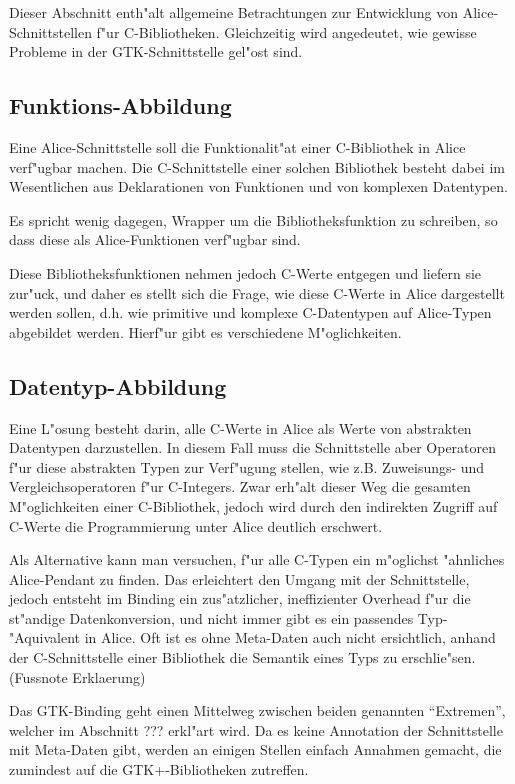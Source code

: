 \documentclass{article}
\begin{document}
Dieser Abschnitt enth"alt allgemeine Betrachtungen zur Entwicklung von
Alice-Schnittstellen f"ur C-Bibliotheken. Gleichzeitig wird angedeutet,
wie gewisse Probleme in der GTK-Schnittstelle gel"ost sind.

\subsection{Funktions-Abbildung}

Eine Alice-Schnittstelle soll die Funktionalit"at einer C-Bibliothek
in Alice verf"ugbar machen. Die C-Schnittstelle einer solchen Bibliothek
besteht dabei im Wesentlichen aus Deklarationen von Funktionen und von
komplexen Datentypen.

Es spricht wenig dagegen, Wrapper um die Bibliotheksfunktion zu schreiben,
so dass diese als Alice-Funktionen verf"ugbar sind. 

Diese Bibliotheksfunktionen nehmen jedoch C-Werte entgegen und liefern sie
zur"uck, und daher es stellt sich die Frage, wie diese C-Werte in Alice
dargestellt werden sollen, d.h. wie primitive und komplexe C-Datentypen
auf Alice-Typen abgebildet werden.
Hierf"ur gibt es verschiedene M"oglichkeiten.

\subsection{Datentyp-Abbildung}

Eine L"osung besteht darin, alle C-Werte in Alice als Werte von abstrakten
Datentypen darzustellen. In diesem Fall muss die Schnittstelle aber Operatoren
f"ur diese abstrakten Typen zur Verf"ugung stellen, wie z.B. Zuweisungs- und
Vergleichsoperatoren f"ur C-Integers.
Zwar erh"alt dieser Weg die gesamten M"oglichkeiten einer C-Bibliothek,
jedoch wird durch den indirekten Zugriff auf C-Werte die Programmierung
unter Alice deutlich erschwert.

Als Alternative kann man versuchen, f"ur alle C-Typen ein m"oglichst
"ahnliches Alice-Pendant zu finden. Das erleichtert den Umgang mit der
Schnittstelle, jedoch entsteht im Binding ein zus"atzlicher, ineffizienter
Overhead f"ur die st"andige Datenkonversion, und nicht immer gibt es
ein passendes Typ-"Aquivalent in Alice. Oft ist es ohne Meta-Daten auch nicht
ersichtlich, anhand der C-Schnittstelle einer Bibliothek die Semantik eines
Typs zu erschlie"sen. (Fussnote Erklaerung)

Das GTK-Binding geht einen Mittelweg zwischen beiden genannten ``Extremen'',
welcher im Abschnitt ??? erkl"art wird.
Da es keine Annotation der Schnittstelle mit Meta-Daten gibt, werden an einigen
Stellen einfach Annahmen gemacht, die zumindest auf die GTK+-Bibliotheken
zutreffen.
\end{document}
